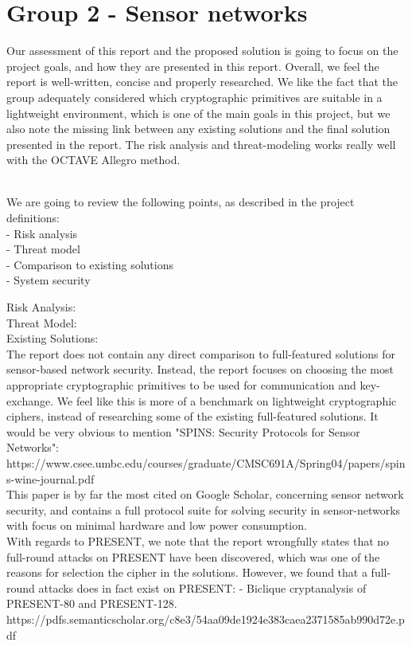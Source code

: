 \section{Group 2 - Sensor networks}

Our assessment of this report and the proposed solution is going to focus on the project goals, and how they are presented in this report.
Overall, we feel the report is well-written, concise and properly researched. We like the fact that the group adequately considered which cryptographic primitives are suitable in a lightweight environment, which is one of the main goals in this project, but we also note the missing link between any existing solutions and the final solution presented in the report. 
The risk analysis and threat-modeling works really well with the OCTAVE Allegro method.

\\We are going to review the following points, as described in the project definitions:
\\- Risk analysis
\\- Threat model
\\- Comparison to existing solutions
\\- System security

Risk Analysis:\\

Threat Model:\\

Existing Solutions:\\
The report does not contain any direct comparison to full-featured solutions for sensor-based network security. Instead, the report focuses on choosing the most appropriate cryptographic primitives to be used for communication and key-exchange. We feel like this is more of a benchmark on lightweight cryptographic ciphers, instead of researching some of the existing full-featured solutions.
It would be very obvious to mention "SPINS: Security Protocols for Sensor Networks":\\
https://www.csee.umbc.edu/courses/graduate/CMSC691A/Spring04/papers/spins-wine-journal.pdf
\\This paper is by far the most cited on Google Scholar, concerning sensor network security, and contains a full protocol suite for solving security in sensor-networks with focus on minimal hardware and low power consumption.\\

With regards to PRESENT, we note that the report wrongfully states that no full-round attacks on PRESENT have been discovered, which was one of the reasons for selection the cipher in the solutions. However, we found that a full-round attacks does in fact exist on PRESENT:
- Biclique cryptanalysis of PRESENT-80 and PRESENT-128.\\ https://pdfs.semanticscholar.org/c8e3/54aa09de1924e383caea2371585ab990d72e.pdf

